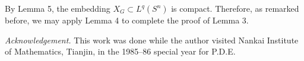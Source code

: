 \documentclass[11pt]{article}
\begin{document}
By Lemma 5, the embedding $X_G \subset L^q(S^n)$ is compact. Therefore, as remarked before, we may apply Lemma 4 to complete the proof of Lemma 3.

\vspace*{1cm}
\noindent\textit{Acknowledgement.}
This work was done while the author visited Nankai Institute of Mathematics, Tianjin,
in the 1985--86 special year for P.D.E.


\end{document}
